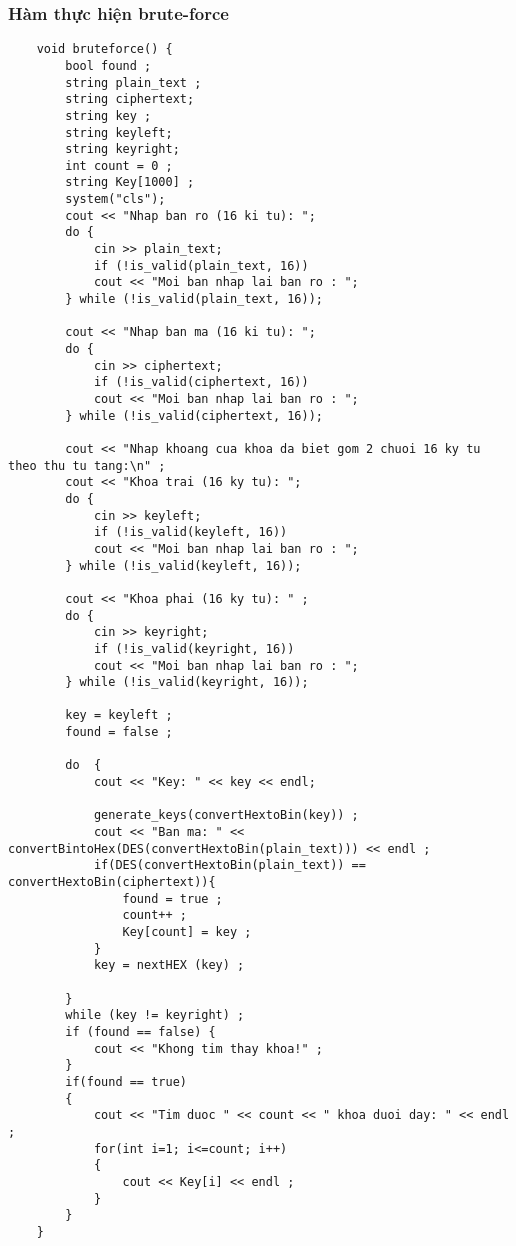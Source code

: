 \subsubsection{Hàm thực hiện brute-force}
\begin{verbatim}
	void bruteforce() {
		bool found ;
		string plain_text ; 
		string ciphertext;
		string key ;  
		string keyleft;
		string keyright;
		int count = 0 ;
		string Key[1000] ;
		system("cls");
		cout << "Nhap ban ro (16 ki tu): ";
		do {
			cin >> plain_text;
			if (!is_valid(plain_text, 16))
			cout << "Moi ban nhap lai ban ro : ";
		} while (!is_valid(plain_text, 16));
		
		cout << "Nhap ban ma (16 ki tu): ";
		do {
			cin >> ciphertext;
			if (!is_valid(ciphertext, 16))
			cout << "Moi ban nhap lai ban ro : ";
		} while (!is_valid(ciphertext, 16));
		
		cout << "Nhap khoang cua khoa da biet gom 2 chuoi 16 ky tu theo thu tu tang:\n" ;
		cout << "Khoa trai (16 ky tu): ";
		do {
			cin >> keyleft;
			if (!is_valid(keyleft, 16))
			cout << "Moi ban nhap lai ban ro : ";
		} while (!is_valid(keyleft, 16));
		
		cout << "Khoa phai (16 ky tu): " ;
		do {
			cin >> keyright;
			if (!is_valid(keyright, 16))
			cout << "Moi ban nhap lai ban ro : ";
		} while (!is_valid(keyright, 16));
		
		key = keyleft ;
		found = false ;
		
		do  { 
			cout << "Key: " << key << endl;
			
			generate_keys(convertHextoBin(key)) ; 
			cout << "Ban ma: " << convertBintoHex(DES(convertHextoBin(plain_text))) << endl ;
			if(DES(convertHextoBin(plain_text)) == convertHextoBin(ciphertext)){
				found = true ;
				count++ ;
				Key[count] = key ;
			}
			key = nextHEX (key) ;
			
		} 
		while (key != keyright) ;
		if (found == false) {
			cout << "Khong tim thay khoa!" ;
		}
		if(found == true) 
		{
			cout << "Tim duoc " << count << " khoa duoi day: " << endl ;
			for(int i=1; i<=count; i++)
			{
				cout << Key[i] << endl ;
			}
		}
	}
\end{verbatim}
